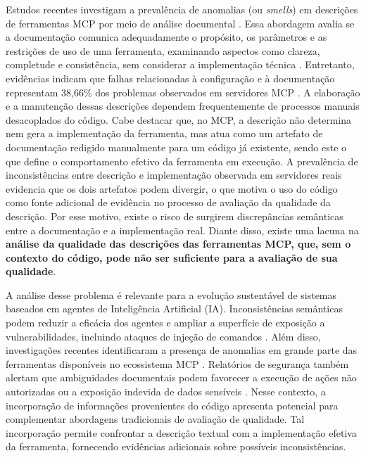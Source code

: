 Estudos recentes investigam a prevalência de anomalias (ou \textit{smells}) em descrições de ferramentas MCP por meio de análise documental \cite{2026arXiv260214878M}. Essa abordagem avalia se a documentação comunica adequadamente o propósito, os parâmetros e as restrições de uso de uma ferramenta, examinando aspectos como clareza, completude e consistência, sem considerar a implementação técnica \cite{mcpAtFirstGlance}. Entretanto, evidências indicam que falhas relacionadas à configuração e à documentação representam 38,66\% dos problemas observados em servidores MCP \cite{Taraghi2026}. A elaboração e a manutenção dessas descrições dependem frequentemente de processos manuais desacoplados do código. Cabe destacar que, no MCP, a descrição não determina nem gera a implementação da ferramenta, mas atua como um artefato de documentação redigido manualmente para um código já existente, sendo este o que define o comportamento efetivo da ferramenta em execução. A prevalência de inconsistências entre descrição e implementação observada em servidores reais \cite{shi2026description} evidencia que os dois artefatos podem divergir, o que motiva o uso do código como fonte adicional de evidência no processo de avaliação da qualidade da descrição. Por esse motivo, existe o risco de surgirem discrepâncias semânticas entre a documentação e a implementação real. Diante disso, existe uma lacuna na \textbf{análise da qualidade das descrições das ferramentas MCP, que, sem o contexto do código, pode não ser suficiente para a avaliação de sua qualidade}.

A análise desse problema é relevante para a evolução sustentável de sistemas baseados em agentes de Inteligência Artificial (IA). Inconsistências semânticas podem reduzir a eficácia dos agentes e ampliar a superfície de exposição a vulnerabilidades, incluindo ataques de injeção de comandos \cite{Taraghi2026}. Além disso, investigações recentes identificaram a presença de anomalias em grande parte das ferramentas disponíveis no ecossistema MCP \cite{mcpAtFirstGlance}. Relatórios de segurança também alertam que ambiguidades documentais podem favorecer a execução de ações não autorizadas ou a exposição indevida de dados sensíveis \cite{NSA2026}. Nesse contexto, a incorporação de informações provenientes do código apresenta potencial para complementar abordagens tradicionais de avaliação de qualidade. Tal incorporação permite confrontar a descrição textual com a implementação efetiva da ferramenta, fornecendo evidências adicionais sobre possíveis inconsistências.

